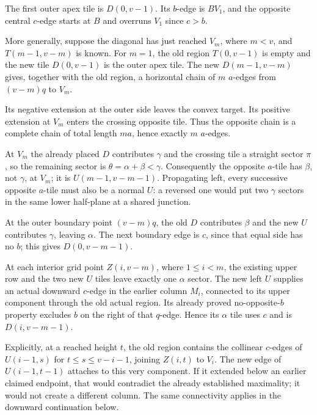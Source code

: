 \documentclass[
  11pt,
  a4paper,
]{article}
\begin{document}
The first outer apex tile is \(D(0,v-1)\). Its \(b\)-edge is \(BV_1\),
and the opposite central \(c\)-edge starts at \(B\) and overruns \(V_1\)
since \(c>b\).

More generally, suppose the diagonal has just reached \(V_m\), where
\(m<v\), and \(T(m-1,v-m)\) is known. For \(m=1\), the old region
\(T(0,v-1)\) is empty and the new tile \(D(0,v-1)\) is the outer apex
tile. The new \(D(m-1,v-m)\) gives, together with the old region, a
horizontal chain of \(m\) \(a\)-edges from \((v-m)q\) to \(V_m\).

Its negative extension at the outer side leaves the convex target. Its
positive extension at \(V_m\) enters the crossing opposite tile. Thus
the opposite chain is a complete chain of total length \(ma\), hence
exactly \(m\) \(a\)-edges.

At \(V_m\) the already placed \(D\) contributes \(\gamma\) and the
crossing tile a straight sector \(\pi\), so the remaining sector is
\(\theta=\alpha+\beta<\gamma\). Consequently the opposite \(a\)-tile has
\(\beta\), not \(\gamma\), at \(V_m\); it is \(U(m-1,v-m-1)\).
Propagating left, every successive opposite \(a\)-tile must also be a
normal \(U\): a reversed one would put two \(\gamma\) sectors in the
same lower half-plane at a shared junction.

At the outer boundary point \((v-m)q\), the old \(D\) contributes
\(\beta\) and the new \(U\) contributes \(\gamma\), leaving \(\alpha\).
The next boundary edge is \(c\), since that equal side has no \(b\);
this gives \(D(0,v-m-1)\).

At each interior grid point \(Z(i,v-m)\), where \(1\le i<m\), the
existing upper row and the two new \(U\) tiles leave exactly one
\(\alpha\) sector. The new left \(U\) supplies an actual downward
\(c\)-edge in the earlier column \(M_i\), connected to its upper
component through the old actual region. Its already proved
no-opposite-\(b\) property excludes \(b\) on the right of that
\(q\)-edge. Hence its \(\alpha\) tile uses \(c\) and is \(D(i,v-m-1)\).

Explicitly, at a reached height \(t\), the old region contains the
collinear \(c\)-edges of \(U(i-1,s)\) for \(t\le s\le v-i-1\), joining
\(Z(i,t)\) to \(V_i\). The new edge of \(U(i-1,t-1)\) attaches to this
very component. If it extended below an earlier claimed endpoint, that
would contradict the already established maximality; it would not create
a different column. The same connectivity applies in the downward
continuation below.
\end{document}
